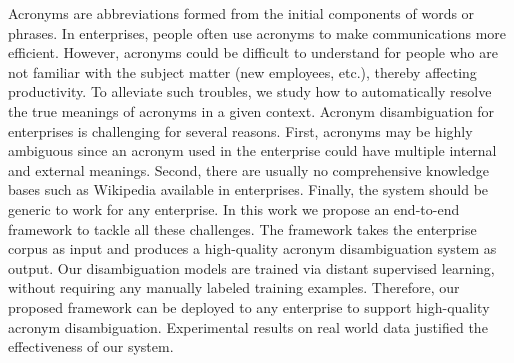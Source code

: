 Acronyms are abbreviations formed from the initial components of words or phrases. In enterprises, people often use acronyms to make communications more efficient. However, acronyms could be difficult to understand for people who are not familiar with the subject matter (new employees, etc.), thereby affecting productivity. To alleviate such troubles, we study how to automatically resolve the true meanings of acronyms in a given context. Acronym disambiguation for enterprises is challenging for several reasons. First, acronyms may be highly ambiguous since an acronym used in the enterprise could have multiple internal and external meanings. Second, there are usually no comprehensive knowledge bases such as Wikipedia available in enterprises. Finally, the system should be generic to work for any enterprise. In this work we propose an end-to-end framework to tackle all these challenges. The framework takes the enterprise corpus as input and produces a high-quality acronym disambiguation system as output. Our disambiguation models are trained via distant supervised learning, without requiring any manually labeled training examples. Therefore, our proposed framework can be deployed to any enterprise to support high-quality acronym disambiguation. Experimental results on real world data justified the effectiveness of our system.
